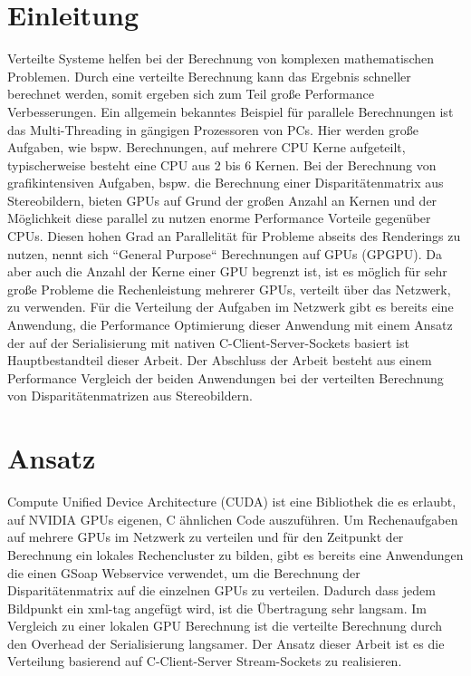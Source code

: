 \documentclass[conference]{IEEEtran}
\begin{document}
\section{Einleitung}
Verteilte Systeme helfen bei der Berechnung von komplexen mathematischen Problemen. Durch eine verteilte Berechnung kann das Ergebnis schneller berechnet werden, somit ergeben sich zum Teil große Performance Verbesserungen. Ein allgemein bekanntes Beispiel für parallele Berechnungen ist das Multi-Threading in gängigen Prozessoren von PCs. Hier werden große Aufgaben, wie bspw. Berechnungen, auf mehrere CPU Kerne aufgeteilt, typischerweise besteht eine CPU aus 2 bis 6 Kernen. Bei der Berechnung von grafikintensiven Aufgaben, bspw. die Berechnung einer Disparitätenmatrix aus Stereobildern, bieten GPUs auf Grund der großen Anzahl an Kernen und der Möglichkeit diese parallel zu nutzen enorme Performance Vorteile gegenüber CPUs. Diesen hohen Grad an Parallelität für Probleme abseits des Renderings zu nutzen, nennt sich “General Purpose“ Berechnungen auf GPUs (GPGPU). Da aber auch die Anzahl der Kerne einer GPU begrenzt ist, ist es möglich für sehr große Probleme die Rechenleistung mehrerer GPUs, verteilt über das Netzwerk, zu verwenden. Für die Verteilung der Aufgaben im Netzwerk gibt es bereits eine Anwendung, die Performance Optimierung dieser Anwendung mit einem Ansatz der auf der Serialisierung mit nativen C-Client-Server-Sockets basiert ist Hauptbestandteil dieser Arbeit. Der Abschluss der Arbeit besteht aus einem Performance Vergleich der beiden Anwendungen bei der verteilten Berechnung von Disparitätenmatrizen aus Stereobildern.

 

\section{Ansatz}
Compute Unified Device Architecture (CUDA) ist eine Bibliothek die es erlaubt, auf NVIDIA GPUs eigenen, C ähnlichen Code auszuführen. Um Rechenaufgaben auf mehrere GPUs im Netzwerk zu verteilen und für den Zeitpunkt der Berechnung ein lokales Rechencluster zu bilden, gibt es bereits eine Anwendungen die einen GSoap Webservice verwendet, um die Berechnung der Disparitätenmatrix auf die einzelnen GPUs zu verteilen. Dadurch dass jedem Bildpunkt ein xml-tag angefügt wird, ist die Übertragung sehr langsam. Im Vergleich zu einer lokalen GPU Berechnung ist die verteilte Berechnung durch den Overhead der Serialisierung langsamer. Der Ansatz dieser Arbeit ist es die Verteilung basierend auf C-Client-Server Stream-Sockets zu realisieren.
\end{document}
